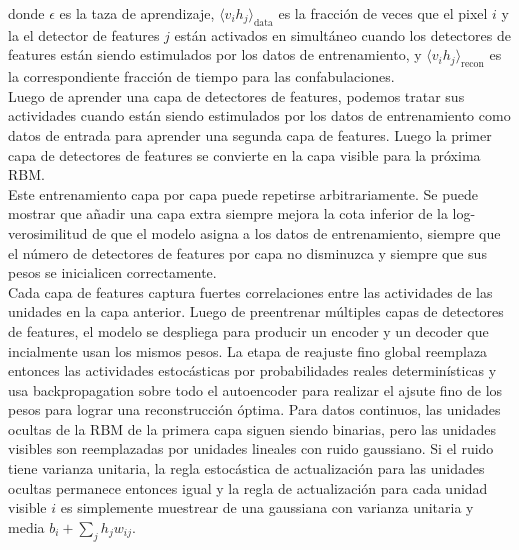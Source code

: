 \documentclass[12pt,a4paper]{article}
\begin{document}
donde $\epsilon$ es la taza de aprendizaje, $\langle v_i h_j \rangle_\text{data}$ es la fracción de veces que el pixel $i$ y la el detector de features $j$ están activados en simultáneo cuando los detectores de features están siendo estimulados por los datos de entrenamiento, y $\langle v_i h_j \rangle_\text{recon}$ es la correspondiente fracción de tiempo para las confabulaciones.\\
Luego de aprender una capa de detectores de features, podemos tratar sus actividades cuando están siendo estimulados por los datos de entrenamiento como datos de entrada para aprender una segunda capa de features. Luego la primer capa de detectores de features se convierte en la capa visible para la próxima RBM.\\
Este entrenamiento capa por capa puede repetirse arbitrariamente. Se puede mostrar que añadir una capa extra siempre mejora la cota inferior de la log-verosimilitud de que el modelo asigna a los datos de entrenamiento, siempre que el número de detectores de features por capa no disminuzca y siempre que sus pesos se inicialicen correctamente.\\
Cada capa de features captura fuertes correlaciones entre las actividades de las unidades en la capa anterior.
Luego de preentrenar múltiples capas de detectores de features, el modelo se despliega para producir un encoder y un decoder que incialmente usan los mismos pesos. La etapa de reajuste fino global reemplaza entonces las actividades estocásticas por probabilidades reales determinísticas y usa backpropagation sobre todo el autoencoder para realizar el ajsute fino de los pesos para lograr una reconstrucción óptima.
Para datos continuos, las unidades ocultas de la RBM de la primera capa siguen siendo binarias, pero las unidades visibles son reemplazadas por unidades lineales con ruido gaussiano. Si el ruido tiene varianza unitaria, la regla estocástica de actualización para las unidades ocultas permanece entonces igual y la regla de actualización para cada unidad visible $i$ es simplemente muestrear de una gaussiana con varianza unitaria y media $b_i + \sum_j h_j w_{ij}$.\\
\end{document}
